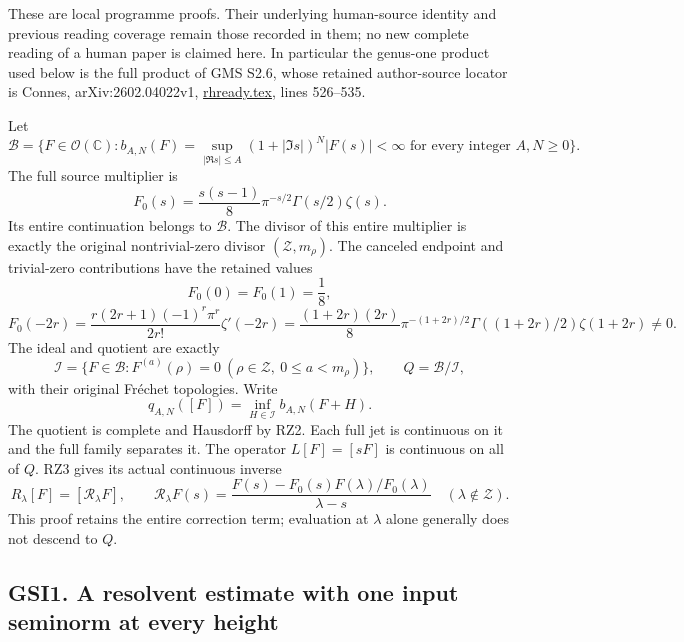 These are local programme proofs. Their underlying human-source identity
and previous reading coverage remain those recorded in them; no new
complete reading of a human paper is claimed here. In particular the
genus-one product used below is the full product of GMS S2.6, whose
retained author-source locator is Connes, arXiv:2602.04022v1,
\href{https://arxiv.org/abs/2602.04022v1}{rhready.tex}, lines 526--535.

Let \[
\mathcal B=\{F\in\mathcal O(\mathbb C):
b_{A,N}(F)=\sup_{|\Re s|\le A}(1+|\Im s|)^N|F(s)|<\infty
\text{ for every integer }A,N\ge0\}.
\tag{GSI0.1}
\] The full source multiplier is \[
F_0(s)=\frac{s(s-1)}8\pi^{-s/2}\Gamma(s/2)\zeta(s).
\tag{GSI0.2}
\] Its entire continuation belongs to \(\mathcal B\). The divisor of
this entire multiplier is exactly the original nontrivial-zero divisor
\((\mathscr Z,m_\rho)\). The canceled endpoint and trivial-zero
contributions have the retained values \[
F_0(0)=F_0(1)=\frac18,
\] \[
F_0(-2r)=\frac{r(2r+1)(-1)^r\pi^r}{2r!}\zeta'(-2r)
=\frac{(1+2r)(2r)}8\pi^{-(1+2r)/2}
\Gamma((1+2r)/2)\zeta(1+2r)\ne0.
\tag{GSI0.3}
\] The ideal and quotient are exactly \[
\mathcal I=\{F\in\mathcal B:F^{(a)}(\rho)=0
\ (\rho\in\mathscr Z,\ 0\le a<m_\rho)\},\qquad
Q=\mathcal B/\mathcal I,
\tag{GSI0.4}
\] with their original Fréchet topologies. Write \[
q_{A,N}([F])=\inf_{H\in\mathcal I}b_{A,N}(F+H).
\tag{GSI0.5}
\] The quotient is complete and Hausdorff by RZ2. Each full jet is
continuous on it and the full family separates it. The operator
\(L[F]=[sF]\) is continuous on all of \(Q\). RZ3 gives its actual
continuous inverse \[
R_\lambda[F]=[\mathscr R_\lambda F],\qquad
\mathscr R_\lambda F(s)=
\frac{F(s)-F_0(s)F(\lambda)/F_0(\lambda)}{\lambda-s}
\quad(\lambda\notin\mathscr Z).
\tag{GSI0.6}
\] This proof retains the entire correction term; evaluation at
\(\lambda\) alone generally does not descend to \(Q\).

\subsection{GSI1. A resolvent estimate with one input seminorm at every
height}\label{gsi1.-a-resolvent-estimate-with-one-input-seminorm-at-every-height}


